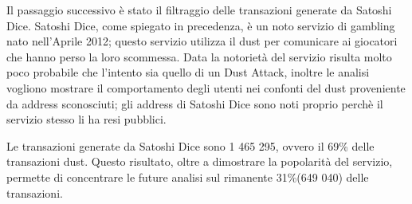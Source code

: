 Il passaggio successivo è stato il filtraggio delle transazioni generate da Satoshi Dice. Satoshi Dice, come spiegato in precedenza, è un noto servizio di gambling nato nell'Aprile 2012; questo servizio utilizza il dust per comunicare ai giocatori che hanno perso la loro scommessa. Data la notorietà del servizio risulta molto poco probabile che l'intento sia quello di un Dust Attack, inoltre le analisi vogliono mostrare il comportamento degli utenti nei confonti del dust proveniente da address sconosciuti; gli address di Satoshi Dice sono noti proprio perchè il servizio stesso li ha resi pubblici.

Le transazioni generate da Satoshi Dice sono 1 465 295, ovvero il 69\% delle transazioni dust. Questo risultato, oltre a dimostrare la popolarità del servizio, permette di concentrare le future analisi sul rimanente 31\%(649 040) delle transazioni.
